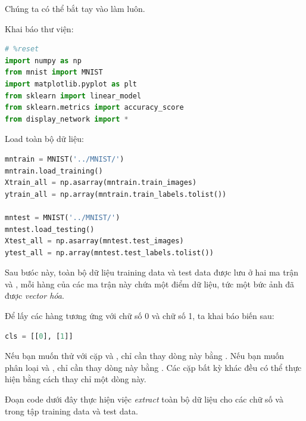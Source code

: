 Chúng ta có thể bắt tay vào làm luôn.  
 
Khai báo thư viện: 
 
\begin{lstlisting}[language=Python]
# %reset 
import numpy as np  
from mnist import MNIST 
import matplotlib.pyplot as plt 
from sklearn import linear_model 
from sklearn.metrics import accuracy_score 
from display_network import * 
\end{lstlisting}
 
Load toàn bộ dữ liệu: 
 
\begin{lstlisting}[language=Python]
mntrain = MNIST('../MNIST/') 
mntrain.load_training() 
Xtrain_all = np.asarray(mntrain.train_images) 
ytrain_all = np.array(mntrain.train_labels.tolist()) 
 
mntest = MNIST('../MNIST/') 
mntest.load_testing() 
Xtest_all = np.asarray(mntest.test_images) 
ytest_all = np.array(mntest.test_labels.tolist()) 
\end{lstlisting}
 
Sau bưóc này, toàn bộ dữ liệu training data và test data được lưu ở hai ma trận  và , mỗi hàng của các ma trận này chứa một điểm dữ liệu, tức một bức ảnh đã được \textit{vector hóa}.  
 
Để lấy các hàng tương ứng với chữ số 0 và chữ số 1, ta khai báo biến sau: 
 
\begin{lstlisting}[language=Python]
cls = [[0], [1]] 
\end{lstlisting}
 
Nếu bạn muốn thử với cặp  và , chỉ cần thay dòng này bằng . Nếu bạn muốn phân loại  và , chỉ cần thay dòng này bằng . Các cặp bất kỳ khác đều có thể thực hiện bằng cách thay chỉ một dòng này.  
 
Đoạn code dưới đây thực hiện việc \textit{extract} toàn bộ dữ liệu cho các chữ số  và  trong tập training data và test data.  
 

